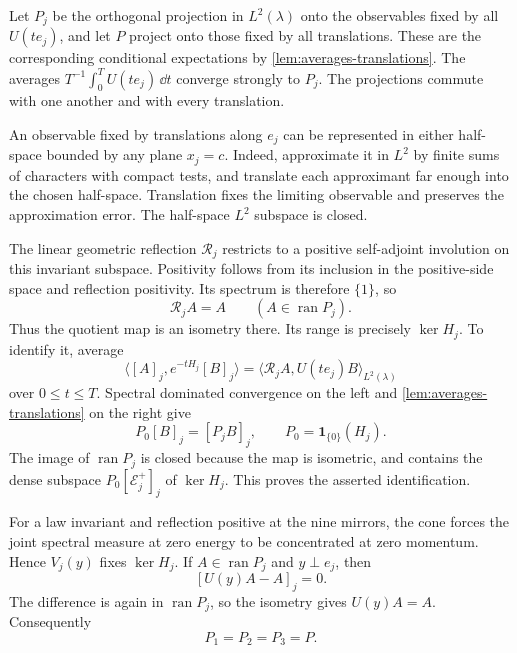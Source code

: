 Let $P_j$ be the orthogonal projection in $L^2(\lambda)$ onto the
observables fixed by all $U(te_j)$, and let $P$ project onto those
fixed by all translations. These are the corresponding conditional
expectations by \cref{lem:averages-translations}. The averages
$T^{-1}\int_0^TU(te_j)\,\dd t$ converge strongly to $P_j$.
The projections commute with one another and with every translation.

An observable fixed by translations along $e_j$ can be represented
in either half-space bounded by any plane $x_j=c$. Indeed, approximate
it in $L^2$ by finite sums of characters with compact tests, and translate
each approximant far enough into the chosen half-space. Translation
fixes the limiting observable and preserves the approximation error.
The half-space $L^2$ subspace is closed.

The linear geometric reflection $\mathcal R_j$ restricts to a positive
self-adjoint involution on this invariant subspace. Positivity follows
from its inclusion in the positive-side space and reflection
positivity. Its spectrum is therefore $\{1\}$, so
\begin{equation}\label{eq:invariant-reflection-fixed}
 \mathcal R_jA=A\qquad(A\in\operatorname{ran}P_j).
\end{equation}
Thus the quotient map is an isometry there. Its range is precisely
$\ker H_j$. To identify it, average
\[
 \langle[A]_j,e^{-tH_j}[B]_j\rangle
     =\langle\mathcal R_jA,U(te_j)B\rangle_{L^2(\lambda)}
\]
over $0\le t\le T$. Spectral dominated convergence on the left and
\cref{lem:averages-translations} on the right give
\begin{equation}\label{eq:zero-energy-class}
 P_0[B]_j=[P_jB]_j,\qquad P_0=\mathbf1_{\{0\}}(H_j).
\end{equation}
The image of $\operatorname{ran}P_j$ is closed because the map is
isometric, and contains the dense subspace $P_0[\mathcal E_j^+]_j$
of $\ker H_j$. This proves the asserted identification.

For a law invariant and reflection positive at the nine mirrors,
the cone forces the joint spectral measure at zero energy to be
concentrated at zero momentum. Hence $V_j(y)$ fixes $\ker H_j$.
If $A\in\operatorname{ran}P_j$ and $y\perp e_j$, then
\[
 [U(y)A-A]_j=0.
\]
The difference is again in $\operatorname{ran}P_j$, so the isometry
gives $U(y)A=A$. Consequently
\begin{equation}\label{eq:invariant-projections-equal}
 P_1=P_2=P_3=P.
\end{equation}

